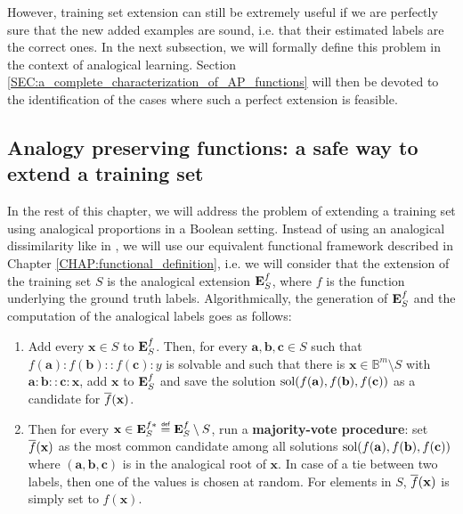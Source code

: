 However, training set extension can still be extremely useful if we are
perfectly sure that the new added examples are sound, i.e. that their estimated
labels are the correct ones. In the next subsection, we will formally define
this problem in the context of analogical learning. Section
\ref{SEC:a_complete_characterization_of_AP_functions} will then be devoted to
the identification of the cases where such a perfect extension is feasible.

\subsection {Analogy preserving functions: a safe way to extend a training set}
\label{SEC:analogy_preserving_presentation}

In the rest of this chapter, we will address the problem of extending a
training set using analogical proportions in a Boolean setting. Instead of
using an analogical dissimilarity like in  \cite{BayMouMicAnqECML07}, we will
use our equivalent
functional framework described in Chapter \ref{CHAP:functional_definition},
i.e. we will consider that the extension of the training set $S$ is the
analogical extension $\mathbf{E}_{S}^{f}$, where $f$ is the function underlying the ground
truth labels. Algorithmically, the generation of $\mathbf{E}_{S}^{f}$ and the computation of
the analogical labels goes as follows:
\begin{enumerate}
  \item Add every $\mathbf{x} \in S$ to $\mathbf{E}_{S}^{f}$. Then, for every
    $\mathbf{a},\mathbf{b},\mathbf{c} \in S$ such that $f(\mathbf{a}) :
    f(\mathbf{b}) :: f(\mathbf{c}) : y$ is solvable and such that there is
    $\mathbf{x} \in \mathbb{B}^m \setminus S$ with $\mathbf{a} : \mathbf{b} ::
    \mathbf{c} : \mathbf{x}$, add $\mathbf{x}$ to $\mathbf{E}_{S}^{f}$ and save
    the solution $\text{sol}(f(\mathbf{a}), f(\mathbf{b}), f(\mathbf{c}))$ as a candidate
    for $\overline{f}(\mathbf{x})$.
\item Then for every $\mathbf{x} \in \esfs \eqdef \esf \setminus S$, run a
  \textbf{majority-vote procedure}: set $\overline{f}(\mathbf{x})$ as the most
    common candidate among all solutions $\text{sol}(f(\mathbf{a}), f(\mathbf{b}),
    f(\mathbf{c}))$ where $(\mathbf{a}, \mathbf{b}, \mathbf{c})$ is in the
    analogical root of $\mathbf{x}$. In case of a tie between two labels, then
    one of the values is chosen at random.  For elements in $S$,
    $\overline{f}(\mathbf{x})$ is simply set to $f(\mathbf{x})$.
\end{enumerate}

